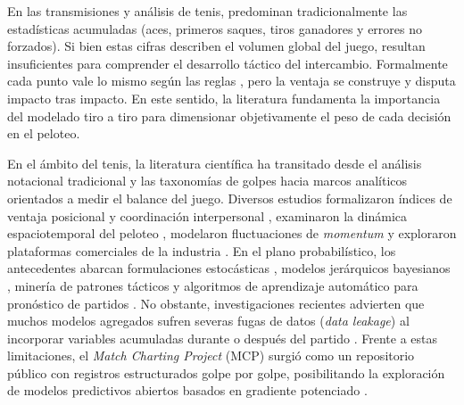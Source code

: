 \documentclass[journal]{IEEEtran}
\begin{document}
En las transmisiones y análisis de tenis, predominan tradicionalmente las estadísticas acumuladas (aces, primeros saques, tiros ganadores y errores no forzados). Si bien estas cifras describen el volumen global del juego, resultan insuficientes para comprender el desarrollo táctico del intercambio. Formalmente cada punto vale lo mismo según las reglas \cite{usta2023tennis}, pero la ventaja se construye y disputa impacto tras impacto. En este sentido, la literatura fundamenta la importancia del modelado tiro a tiro \cite{Floyd2020ShotByShot} para dimensionar objetivamente el peso de cada decisión en el peloteo.

En el ámbito del tenis, la literatura científica ha transitado desde el análisis notacional tradicional \cite{o2001notational} y las taxonomías de golpes \cite{kovalchik2018shot} hacia marcos analíticos orientados a medir el balance del juego. Diversos estudios formalizaron índices de ventaja posicional y coordinación interpersonal \cite{carvalho2013elucidating, vanMeurs2021PositionalAdvantage}, examinaron la dinámica espaciotemporal del peloteo \cite{emery2020augmenting}, modelaron fluctuaciones de \textit{momentum} \cite{liu2025quantifying} y exploraron plataformas comerciales de la industria \cite{infosysAtp2026}. En el plano probabilístico, los antecedentes abarcan formulaciones estocásticas \cite{floyd2017applying}, modelos jerárquicos bayesianos \cite{ingram2019point}, minería de patrones tácticos \cite{liu2023insight} y algoritmos de aprendizaje automático para pronóstico de partidos \cite{kovalchik2016searching, rui2024forecasting, poudel2026unified, illum2025analysis}. No obstante, investigaciones recientes advierten que muchos modelos agregados sufren severas fugas de datos (\textit{data leakage}) al incorporar variables acumuladas durante o después del partido \cite{gao2021random}. Frente a estas limitaciones, el \textit{Match Charting Project} (MCP) \cite{sackmann2026mcp} surgió como un repositorio público con registros estructurados golpe por golpe, posibilitando la exploración de modelos predictivos abiertos basados en gradiente potenciado \cite{youtubeXGBoostTennis2025}.
\end{document}
